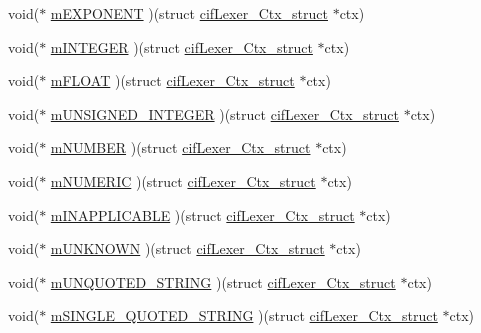 \begin{DoxyCompactItemize}
\item 
void($\ast$ \hyperlink{structcif_lexer___ctx__struct_a490a85f69c203747fa1e2aedd4218aca}{m\-E\-X\-P\-O\-N\-E\-N\-T} )(struct \hyperlink{structcif_lexer___ctx__struct}{cif\-Lexer\-\_\-\-Ctx\-\_\-struct} $\ast$ctx)
\item 
void($\ast$ \hyperlink{structcif_lexer___ctx__struct_a44ba852dec6f6c657af3b4098123babf}{m\-I\-N\-T\-E\-G\-E\-R} )(struct \hyperlink{structcif_lexer___ctx__struct}{cif\-Lexer\-\_\-\-Ctx\-\_\-struct} $\ast$ctx)
\item 
void($\ast$ \hyperlink{structcif_lexer___ctx__struct_a1c9726425571cdf12596b3206467a076}{m\-F\-L\-O\-A\-T} )(struct \hyperlink{structcif_lexer___ctx__struct}{cif\-Lexer\-\_\-\-Ctx\-\_\-struct} $\ast$ctx)
\item 
void($\ast$ \hyperlink{structcif_lexer___ctx__struct_a07ef255493efdb864fee1cc988928de5}{m\-U\-N\-S\-I\-G\-N\-E\-D\-\_\-\-I\-N\-T\-E\-G\-E\-R} )(struct \hyperlink{structcif_lexer___ctx__struct}{cif\-Lexer\-\_\-\-Ctx\-\_\-struct} $\ast$ctx)
\item 
void($\ast$ \hyperlink{structcif_lexer___ctx__struct_a247812c74670d68786941d3c0d96d0e2}{m\-N\-U\-M\-B\-E\-R} )(struct \hyperlink{structcif_lexer___ctx__struct}{cif\-Lexer\-\_\-\-Ctx\-\_\-struct} $\ast$ctx)
\item 
void($\ast$ \hyperlink{structcif_lexer___ctx__struct_aed863c388b8b2a484ec710f322d84a30}{m\-N\-U\-M\-E\-R\-I\-C} )(struct \hyperlink{structcif_lexer___ctx__struct}{cif\-Lexer\-\_\-\-Ctx\-\_\-struct} $\ast$ctx)
\item 
void($\ast$ \hyperlink{structcif_lexer___ctx__struct_af7c447606492fd9f3902fa59d9d8f77b}{m\-I\-N\-A\-P\-P\-L\-I\-C\-A\-B\-L\-E} )(struct \hyperlink{structcif_lexer___ctx__struct}{cif\-Lexer\-\_\-\-Ctx\-\_\-struct} $\ast$ctx)
\item 
void($\ast$ \hyperlink{structcif_lexer___ctx__struct_a9b13cfad1301cedf198eee8a8a918ebd}{m\-U\-N\-K\-N\-O\-W\-N} )(struct \hyperlink{structcif_lexer___ctx__struct}{cif\-Lexer\-\_\-\-Ctx\-\_\-struct} $\ast$ctx)
\item 
void($\ast$ \hyperlink{structcif_lexer___ctx__struct_a310180509619e27fcc718fd0af2a6256}{m\-U\-N\-Q\-U\-O\-T\-E\-D\-\_\-\-S\-T\-R\-I\-N\-G} )(struct \hyperlink{structcif_lexer___ctx__struct}{cif\-Lexer\-\_\-\-Ctx\-\_\-struct} $\ast$ctx)
\item 
void($\ast$ \hyperlink{structcif_lexer___ctx__struct_ab4cb027bc2663c343c47f519376587c3}{m\-S\-I\-N\-G\-L\-E\-\_\-\-Q\-U\-O\-T\-E\-D\-\_\-\-S\-T\-R\-I\-N\-G} )(struct \hyperlink{structcif_lexer___ctx__struct}{cif\-Lexer\-\_\-\-Ctx\-\_\-struct} $\ast$ctx)

\end{DoxyCompactItemize}
